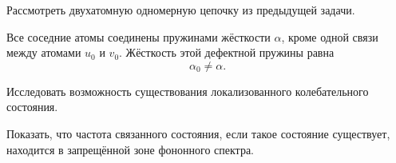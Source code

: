 \documentclass[../final.tex]{subfiles}
\begin{document}


\condition

Рассмотреть двухатомную одномерную цепочку
из предыдущей задачи.

Все соседние атомы соединены пружинами жёсткости $\alpha$,
кроме одной связи между атомами $u_0$ и $v_0$.
Жёсткость этой дефектной пружины равна
%
\begin{equation*}
    \alpha_0\neq\alpha.
\end{equation*}
%

Исследовать возможность существования
локализованного колебательного состояния.

Показать, что частота связанного состояния,
если такое состояние существует,
находится в запрещённой зоне фононного спектра.


\end{document}
